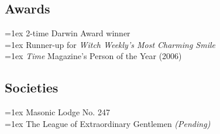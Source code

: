 \documentclass{resume}
\begin{document}
\begin{minipage}[t]{0.3\textwidth}
\begin{resumestyle}
\end{resumestyle}


% 
% 
% 
% 
% 
% 

\begin{resumestyle}

\subsection{Awards}
\hangindent=1ex 2-time Darwin Award winner \\
\hangindent=1ex Runner-up for \textit{Witch Weekly's Most Charming Smile} \\
\hangindent=1ex \textit{Time} Magazine's Person of the Year (2006) \\
\sectionsep%

\subsection{Societies}
\hangindent=1ex Masonic Lodge No. 247 \\
\hangindent=1ex The League of Extraordinary Gentlemen \textit{(Pending)}\\


\end{resumestyle}



\end{minipage}\hfill%
\end{document}
